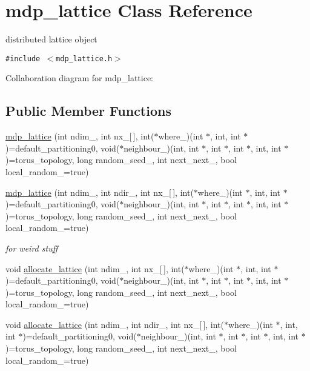 \hypertarget{classmdp__lattice}{
\section{mdp\_\-lattice Class Reference}
\label{classmdp__lattice}
}
distributed lattice object  


{\tt \#include $<$mdp\_\-lattice.h$>$}

Collaboration diagram for mdp\_\-lattice:\subsection*{Public Member Functions}
\begin{CompactItemize}
\item 
\hyperlink{classmdp__lattice_2a5e64934c300b14f60a05ddf4f0c73d}{mdp\_\-lattice} (int ndim\_\-, int nx\_\-\mbox{[}$\,$\mbox{]}, int($\ast$where\_\-)(int $\ast$, int, int $\ast$)=default\_\-partitioning0, void($\ast$neighbour\_\-)(int, int $\ast$, int $\ast$, int $\ast$, int, int $\ast$)=torus\_\-topology, long random\_\-seed\_, int next\_\-next\_, bool local\_\-random\_\-=true)
\item 
\hypertarget{classmdp__lattice_0f0cbe241c45ddb8c002bce59ea15cef}{
\hyperlink{classmdp__lattice_0f0cbe241c45ddb8c002bce59ea15cef}{mdp\_\-lattice} (int ndim\_\-, int ndir\_\-, int nx\_\-\mbox{[}$\,$\mbox{]}, int($\ast$where\_\-)(int $\ast$, int, int $\ast$)=default\_\-partitioning0, void($\ast$neighbour\_\-)(int, int $\ast$, int $\ast$, int $\ast$, int, int $\ast$)=torus\_\-topology, long random\_\-seed\_, int next\_\-next\_, bool local\_\-random\_\-=true)}
\label{classmdp__lattice_0f0cbe241c45ddb8c002bce59ea15cef}

\begin{CompactList}\small\item\em for weird stuff \item\end{CompactList}\item 
void \hyperlink{classmdp__lattice_b98e2af8a05ed69c4b6df4a632fa01ce}{allocate\_\-lattice} (int ndim\_\-, int nx\_\-\mbox{[}$\,$\mbox{]}, int($\ast$where\_\-)(int $\ast$, int, int $\ast$)=default\_\-partitioning0, void($\ast$neighbour\_\-)(int, int $\ast$, int $\ast$, int $\ast$, int, int $\ast$)=torus\_\-topology, long random\_\-seed\_, int next\_\-next\_, bool local\_\-random\_\-=true)
\item 
\hypertarget{classmdp__lattice_879165fc018bd9c5dca6128d533f3e64}{
void \hyperlink{classmdp__lattice_879165fc018bd9c5dca6128d533f3e64}{allocate\_\-lattice} (int ndim\_\-, int ndir\_\-, int nx\_\-\mbox{[}$\,$\mbox{]}, int($\ast$where\_\-)(int $\ast$, int, int $\ast$)=default\_\-partitioning0, void($\ast$neighbour\_\-)(int, int $\ast$, int $\ast$, int $\ast$, int, int $\ast$)=torus\_\-topology, long random\_\-seed\_, int next\_\-next\_, bool local\_\-random\_\-=true)}
\label{classmdp__lattice_879165fc018bd9c5dca6128d533f3e64}


\end{CompactItemize}
